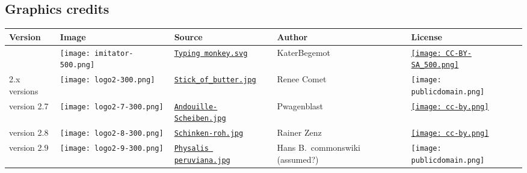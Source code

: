 \subsection*{Graphics credits}

\newcommand{\ccbythree}{\href{https://creativecommons.org/licenses/by/3.0/}{\texttt{[image: cc-by.png]}}}
\newcommand{\ccbysathree}{\href{https://creativecommons.org/licenses/by-sa/3.0/}{\texttt{[image: CC-BY-SA\_500.png]}}}
\newcommand{\cczero}{\href{https://creativecommons.org/publicdomain/zero/1.0/}{\texttt{[image: cc-zero.png]}}}
\newcommand{\publicdomain}{\texttt{[image: publicdomain.png]}}

\begin{longtable}{| l | l | p{3.5cm} | p{3cm} | l |}
	\hline
	\textbf{Version} & \textbf{Image} & \textbf{Source} & \textbf{Author} & \textbf{License}
	\\\hline
	\imitator{} & \texttt{[image: imitator-500.png]} & \href{https://commons.wikimedia.org/wiki/File:Typing_monkey.svg}{\nolinkurl{Typing monkey.svg}} & KaterBegemot & \ccbysathree{}
	\\\hline
	2.x versions & \texttt{[image: logo2-300.png]} & \href{https://commons.wikimedia.org/wiki/File:Stick_of_butter.jpg}{\nolinkurl{Stick_of_butter.jpg}} & Renee Comet & \publicdomain{}
	\\\hline
	version 2.7 & \texttt{[image: logo2-7-300.png]} & \href{https://commons.wikimedia.org/wiki/File:Andouille-Scheiben.jpg}{\nolinkurl{Andouille-Scheiben.jpg}} & Pwagenblast & \ccbythree{}
	\\\hline
	version 2.8 & \texttt{[image: logo2-8-300.png]} & \href{https://commons.wikimedia.org/wiki/File:Schinken-roh.jpg}{\nolinkurl{Schinken-roh.jpg}} & Rainer Zenz & \ccbythree{}
	\\\hline
	version 2.9 & \texttt{[image: logo2-9-300.png]} & \href{https://commons.wikimedia.org/wiki/File:Physalis_peruviana.jpg}{\nolinkurl{Physalis peruviana.jpg}} & Hans B.~commonswiki (assumed?) & \publicdomain{}

\end{longtable}
